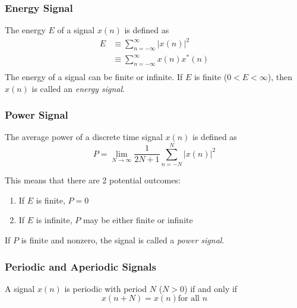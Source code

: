 \subsubsection{Energy Signal}\label{subsubsec:Energy Signal}
\begin{definition}\label{def:Energy Signal}
  The energy $E$ of a signal $x(n)$ is defined as
  \begin{equation}\label{eq:Energy Signal}
    \begin{aligned}
      E &\equiv \sum_{n=-\infty}^{\infty} \lvert x(n) \rvert^{2} \\
      &\equiv \sum_{n=-\infty}^{\infty} x(n) x^{*}(n) \\
    \end{aligned}
  \end{equation}
  The energy of a signal can be finite or infinite. If $E$ is finite ($0 < E < \infty$), then $x(n)$ is called an \emph{energy signal}.
\end{definition}

\subsubsection{Power Signal}\label{subsubsec:Power Signal}
\begin{definition}\label{def:Power Signal}
  The average power of a discrete time signal $x(n)$ is defined as
  \begin{equation}\label{eq:Power Signal}
    P = \lim_{N \to \infty} \frac{1}{2N+1} \sum_{n=-N}^{N} \lvert x(n) \rvert ^{2}
  \end{equation}

  This means that there are 2 potential outcomes:
  \begin{enumerate}[noitemsep]
  \item If $E$ is finite, $P=0$
  \item If $E$ is infinite, $P$ may be either finite or infinite
  \end{enumerate}

  If $P$ is finite and nonzero, the signal is called a \emph{power signal}.
\end{definition}

\subsubsection{Periodic and Aperiodic Signals}\label{subsubsec:Periodic Aperiodic Signals}
A signal $x(n)$ is periodic with period $N$ ($N>0$) if and only if
\begin{equation}\label{eq:Periodic Signal}
  x(n+N) = x(n) \text{for all } n
\end{equation}

